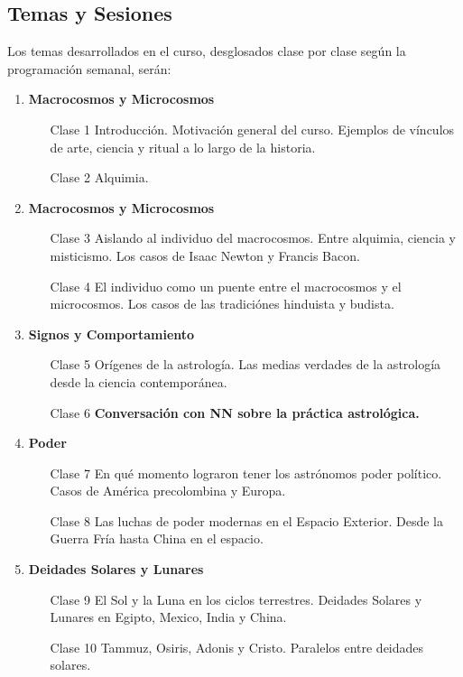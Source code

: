 \documentclass{report}
\begin{document}
\subsection*{Temas y Sesiones}

Los temas desarrollados en el curso, desglosados clase por clase seg\'un
la programaci\'on semanal, ser\'an:


\begin{enumerate}
\item {\bf Macrocosmos y Microcosmos}
\begin{itemize}
\item[Clase 1] Introducci\'on. Motivaci\'on general del
  curso. Ejemplos de v\'inculos de arte, ciencia y ritual a lo
  largo de la historia.
\item[Clase 2] Alquimia.
\end{itemize}

\item {\bf Macrocosmos y Microcosmos}
\begin{itemize}
\item[Clase 3]  Aislando al individuo del macrocosmos. Entre alquimia, ciencia y
  misticismo. Los casos de Isaac Newton y Francis Bacon.  
\item[Clase 4] El individuo como un puente entre el macrocosmos y el
  microcosmos. Los casos de las tradici\'ones hinduista y budista.
\end{itemize}

\item {\bf Signos y Comportamiento}
\begin{itemize}
\item[Clase 5] Or\'igenes de la astrolog\'ia. Las medias verdades de
  la astrolog\'ia desde la ciencia contempor\'anea. 
\item[Clase 6] {\bf Conversaci\'on con NN sobre la pr\'actica
  astrol\'ogica.} 
\end{itemize}

\item {\bf Poder}
\begin{itemize}
\item[Clase 7] En qu\'e momento lograron tener los astr\'onomos poder
  pol\'itico. Casos de Am\'erica precolombina y Europa.
\item[Clase 8] Las luchas de poder modernas en el Espacio
  Exterior. Desde la Guerra Fr\'ia hasta China en el espacio.
\end{itemize}

\item {\bf Deidades Solares y Lunares}
\begin{itemize}
\item[Clase 9] El Sol y la Luna en los ciclos terrestres. Deidades
  Solares y Lunares en Egipto, Mexico, India y China.
\item[Clase 10] Tammuz, Osiris, Adonis y Cristo. Paralelos entre
  deidades solares.
\end{itemize}


\end{enumerate}
\end{document}
